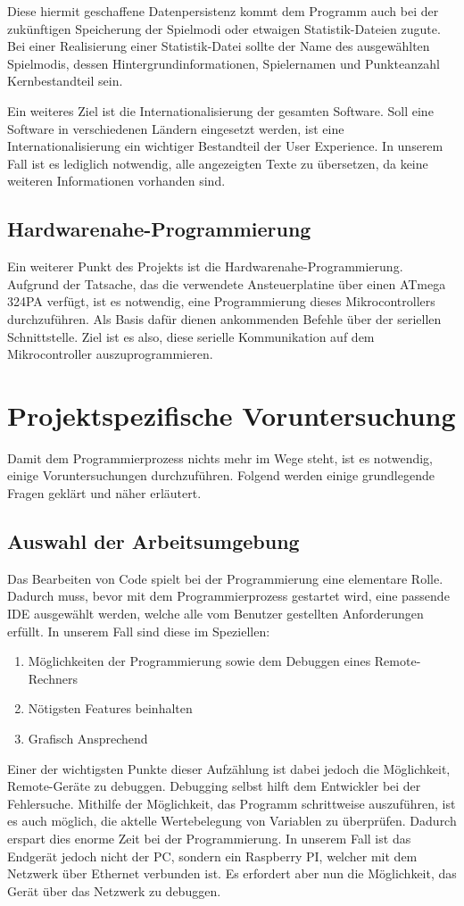 Diese hiermit geschaffene Datenpersistenz kommt dem Programm auch bei der zukünftigen Speicherung der Spielmodi oder etwaigen Statistik-Dateien zugute.
Bei einer Realisierung einer Statistik-Datei sollte der Name des ausgewählten Spielmodis, dessen Hintergrundinformationen, Spielernamen und Punkteanzahl Kernbestandteil sein.

Ein weiteres Ziel ist die Internationalisierung der gesamten Software.
Soll eine Software in verschiedenen Ländern eingesetzt werden, ist eine Internationalisierung ein wichtiger Bestandteil der User Experience.
In unserem Fall ist es lediglich notwendig, alle angezeigten Texte zu übersetzen, da keine weiteren Informationen vorhanden sind.

\subsection{Hardwarenahe-Programmierung}\label{subsec:hardwarenahe-programmierung}
Ein weiterer Punkt des Projekts ist die Hardwarenahe-Programmierung.
Aufgrund der Tatsache, das die verwendete Ansteuerplatine über einen ATmega 324PA verfügt, ist es notwendig, eine Programmierung dieses Mikrocontrollers durchzuführen.
Als Basis dafür dienen ankommenden Befehle über der seriellen Schnittstelle.
Ziel ist es also, diese serielle Kommunikation auf dem Mikrocontroller auszuprogrammieren.

\section{Projektspezifische Voruntersuchung}\label{sec:projektspezifische-voruntersuchung}
Damit dem Programmierprozess nichts mehr im Wege steht, ist es notwendig, einige Voruntersuchungen durchzuführen.
Folgend werden einige grundlegende Fragen geklärt und näher erläutert.
\subsection{Auswahl der Arbeitsumgebung}\label{subsec:auswahl-der-arbeitsumgebung}
Das Bearbeiten von Code spielt bei der Programmierung eine elementare Rolle.
Dadurch muss, bevor mit dem Programmierprozess gestartet wird, eine passende IDE ausgewählt werden, welche alle vom Benutzer gestellten Anforderungen erfüllt.
In unserem Fall sind diese im Speziellen:
\begin{enumerate}
    \item Möglichkeiten der Programmierung sowie dem Debuggen eines Remote-Rechners
    \item Nötigsten Features beinhalten
    \item Grafisch Ansprechend
\end{enumerate}
Einer der wichtigsten Punkte dieser Aufzählung ist dabei jedoch die Möglichkeit, Remote-Geräte zu debuggen.
Debugging selbst hilft dem Entwickler bei der Fehlersuche.
Mithilfe der Möglichkeit, das Programm schrittweise auszuführen, ist es auch möglich, die aktelle Wertebelegung von Variablen zu überprüfen.
Dadurch erspart dies enorme Zeit bei der Programmierung.
In unserem Fall ist das Endgerät jedoch nicht der PC, sondern ein Raspberry PI, welcher mit dem Netzwerk über Ethernet verbunden ist.
Es erfordert aber nun die Möglichkeit, das Gerät über das Netzwerk zu debuggen.
